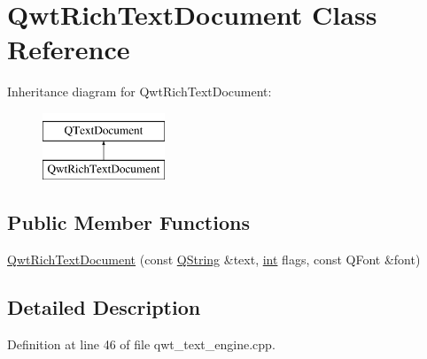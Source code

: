 \hypertarget{class_qwt_rich_text_document}{\section{Qwt\-Rich\-Text\-Document Class Reference}
\label{class_qwt_rich_text_document}
}
Inheritance diagram for Qwt\-Rich\-Text\-Document\-:\begin{figure}[H]
\begin{center}
\leavevmode
\includegraphics[height=2.000000cm]{class_qwt_rich_text_document}
\end{center}
\end{figure}
\subsection*{Public Member Functions}
\begin{DoxyCompactItemize}
\item 
\hyperlink{class_qwt_rich_text_document_aeeff19e2c1c59a75643095ec29437cd5}{Qwt\-Rich\-Text\-Document} (const \hyperlink{group___u_a_v_objects_plugin_gab9d252f49c333c94a72f97ce3105a32d}{Q\-String} \&text, \hyperlink{ioapi_8h_a787fa3cf048117ba7123753c1e74fcd6}{int} flags, const Q\-Font \&font)
\end{DoxyCompactItemize}


\subsection{Detailed Description}


Definition at line 46 of file qwt\-\_\-text\-\_\-engine.\-cpp.



